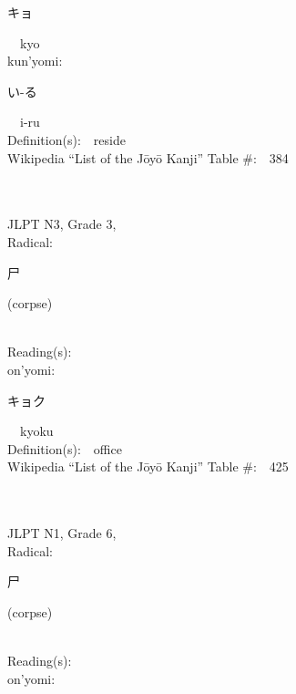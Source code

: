 \begin{multicols}{2}
{\hspace*{2em}}{\begin{CJK}{UTF8}{min} キョ \end{CJK}}\ \ kyo\ \ \\
{\hspace*{1em}}kun'yomi:\ \ \\
{\hspace*{2em}}{\begin{CJK}{UTF8}{min} い-る \end{CJK}}\ \ i-ru\ \ \\
Definition(s):\ \ reside \\
Wikipedia ``List of the J\=oy\=o Kanji'' Table \#:\ \ 384 \\
\ \ \\
{\fontsize{34pt}{40pt}  }\ \ \\  %
{JLPT N3, Grade 3, \\Radical:\ \ {\begin{CJK}{UTF8}{min} 尸 \end{CJK}} (corpse) } \\
Reading(s):\ \ \\
{\hspace*{1em}}on'yomi:\ \ \\
{\hspace*{2em}}{\begin{CJK}{UTF8}{min} キョク \end{CJK}}\ \ kyoku\ \ \\
Definition(s):\ \ office \\
Wikipedia ``List of the J\=oy\=o Kanji'' Table \#:\ \ 425 \\
\ \ \\
{\fontsize{34pt}{40pt}  }\ \ \\  %
{JLPT N1, Grade 6, \\Radical:\ \ {\begin{CJK}{UTF8}{min} 尸 \end{CJK}} (corpse) } \\
Reading(s):\ \ \\
{\hspace*{1em}}on'yomi:\ \ \\

\end{multicols}
